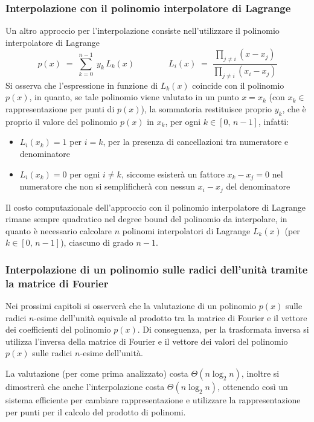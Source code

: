 \subsubsection*{Interpolazione con il polinomio interpolatore di Lagrange}
Un altro approccio per l'interpolazione consiste nell'utilizzare il polinomio interpolatore di Lagrange
\[p(x) \; = \; \sum_{k=0}^{n-1} \; y_k \, L_k(x) \qquad\qquad L_i(x) \; = \; \frac{\displaystyle \prod_{j \neq i} (x - x_j)}{\displaystyle \prod_{j \neq i} (x_i - x_j)}\]
Si osserva che l'espressione in funzione di \(L_k(x)\) coincide con il polinomio \(p(x)\), in quanto, se tale polinomio
viene valutato in un punto \(x = x_k\) (con \(x_k \in\) rappresentazione per punti di \(p(x)\)), la sommatoria restituisce
proprio \(y_k\), che è proprio il valore del polinomio \(p(x)\) in \(x_k\), per ogni \(k \in [0, \, n-1]\), infatti:
\begin{itemize}
	\item \(L_i(x_k) = 1\) per \(i = k\), per la presenza di cancellazioni tra numeratore e denominatore
	\item \(L_i(x_k) = 0\) per ogni \(i \neq k\), siccome esisterà un fattore \(x_k - x_j = 0\) nel numeratore
	che non si semplificherà con nessun \(x_i - x_j\) del denominatore
\end{itemize}

\noindent
Il costo computazionale dell'approccio con il polinomio interpolatore di Lagrange rimane sempre quadratico nel degree bound
del polinomio da interpolare, in quanto è necessario calcolare \(n\) polinomi interpolatori di Lagrange \(L_k(x)\) (per
\(k \in [0, \, n-1]\)), ciascuno di grado \(n-1\).

\subsubsection*{Interpolazione di un polinomio sulle radici dell'unità tramite la matrice di Fourier}
Nei prossimi capitoli si osserverà che la valutazione di un polinomio \(p(x)\) sulle radici \(n\)-esime dell'unità
equivale al prodotto tra la matrice di Fourier e il vettore dei coefficienti del polinomio \(p(x)\). Di conseguenza,
per la trasformata inversa si utilizza l'inversa della matrice di Fourier e il vettore dei valori del polinomio \(p(x)\)
sulle radici \(n\)-esime dell'unità.

La valutazione (per come prima analizzato) costa \(\Theta(n \log_2 n)\), inoltre si dimostrerà che anche l'interpolazione costa \(\Theta(n \log_2 n)\),
ottenendo così un sistema efficiente per cambiare rappresentazione e utilizzare la rappresentazione per punti per il
calcolo del prodotto di polinomi.

